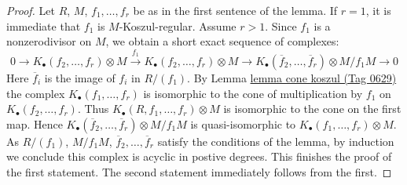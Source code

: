 \documentclass{amsart}
\theoremstyle{plain}
\theoremstyle{definition}
\theoremstyle{remark}
\numberwithin{equation}{subsection}
\begin{document}
\begin{proof}
Let $R$, $M$, $f_1, \ldots, f_r$ be as in the first sentence of the lemma.
If $r = 1$, it is immediate that $f_1$ is $M$-Koszul-regular.
Assume $r > 1$. Since $f_1$ is a nonzerodivisor on $M$, we obtain
a short exact sequence of complexes:
$$
0 \to K_\bullet(f_2, \ldots, f_r) \otimes M
\xrightarrow{f_1}
K_\bullet(f_2, \ldots, f_r) \otimes M \to
K_\bullet(\overline{f}_2, \ldots, \overline{f}_r) \otimes M/f_1M \to 0
$$
Here $\overline{f}_i$ is the image of $f_i$ in $R/(f_1)$. By
Lemma \href{https://stacks.math.columbia.edu/tag/0629}{lemma cone koszul (Tag 0629)}
the complex $K_\bullet(f_1, \ldots, f_r)$
is isomorphic to the cone of multiplication by $f_1$
on $K_\bullet(f_2, \ldots, f_r)$. Thus
$K_\bullet(R, f_1, \ldots, f_r) \otimes M$ is isomorphic
to the cone on the first map. Hence
$K_\bullet(\overline{f}_2, \ldots, \overline{f}_r) \otimes M/f_1M$
is quasi-isomorphic to $K_\bullet(f_1, \ldots, f_r) \otimes M$.
As $R/(f_1)$, $M/f_1M$, $\overline{f}_2, \ldots, \overline{f}_r$
satisfy the conditions of the lemma, by induction we conclude
this complex is acyclic in postive degrees. This finishes the proof
of the first statement. The second statement immediately follows
from the first.
\end{proof}
\end{document}
